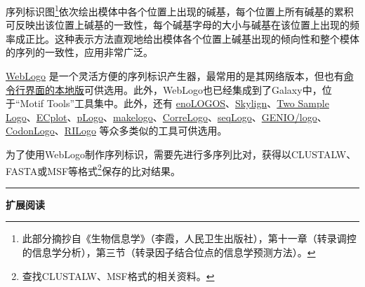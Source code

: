 \documentclass[11pt,a4paper,twoside]{book}
\begin{document}
序列标识图\footnote{此部分摘抄自《生物信息学》（李霞，人民卫生出版社），第十一章（转录调控的信息学分析），第三节（转录因子结合位点的信息学预测方法）。}依次绘出模体中各个位置上出现的碱基，每个位置上所有碱基的累积可反映出该位置上碱基的一致性，每个碱基字母的大小与碱基在该位置上出现的频率成正比。这种表示方法直观地给出模体各个位置上碱基出现的倾向性和整个模体的序列的一致性，应用非常广泛。

\href{http://weblogo.threepluson.com}{WebLogo} 是一个灵活方便的序列标识产生器，最常用的是其网络版本，但也有\href{http://code.google.com/p/weblogo/}{命令行界面的本地版}可供选用。此外，WebLogo也已经集成到了Galaxy中，位于“Motif Tools”工具集中。此外，还有 \href{http://www.benoslab.pitt.edu/cgi-bin/enologos/enologos.cgi}{enoLOGOS}、\href{http://skylign.org/}{Skylign}、\href{http://www.twosamplelogo.org/}{Two Sample Logo}、\href{https://yiplab.cse.cuhk.edu.hk/ecplot/}{ECplot}、\href{https://plogo.uconn.edu/}{pLogo}、\href{http://schneider.ncifcrf.gov/delila/makelogo.html}{makelogo}、\href{http://www.ccrnp.ncifcrf.gov/users/bshapiro/webserver\_index.html}{CorreLogo}、\href{http://bioconductor.org/packages/release/bioc/html/seqLogo.html}{seqLogo}、\href{http://www.biogenio.com/logo/logo.cgi}{GENIO/logo}、\href{http://recode.ucc.ie/CodonLogo/}{CodonLogo}、\href{http://rth.dk/resources/rilogo/}{RILogo} 等众多类似的工具可供选用。 

为了使用WebLogo制作序列标识，需要先进行多序列比对，获得以CLUSTALW、FASTA或MSF等格式\footnote{查找CLUSTALW、MSF格式的相关资料。}保存的比对结果。
\vspace{0.5cm}
\hrule height 3pt

\noindent
{\large \bfseries \HandPencilLeft 扩展阅读}
\end{document}
